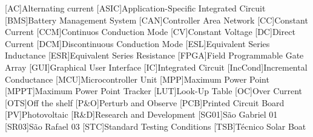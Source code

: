 



\begin{acronym}[H.264/mppt]

    [AC]{Alternating current}
    [ASIC]{Application-Specific Integrated Circuit}
    [BMS]{Battery Management System}
    [CAN]{Controller Area Network}
    [CC]{Constant Current}
    [CCM]{Continuos Conduction Mode}
    [CV]{Constant Voltage}
    [DC]{Direct Current}
    [DCM]{Discontinuous Conduction Mode}
    [ESL]{Equivalent Series Inductance}
    [ESR]{Equivalent Series Resistance}
    [FPGA]{Field Programmable Gate Array}
    [GUI]{Graphical User Interface}
    [IC]{Integrated Circuit}
    [IncCond]{Incremental Conductance}
    [MCU]{Microcontroller Unit}
    [MPP]{Maximum Power Point}
    [MPPT]{Maximum Power Point Tracker}
    [LUT]{Look-Up Table}
    [OC]{Over Current}
    [OTS]{Off the shelf}
    [P\&O]{Perturb and Observe}
    [PCB]{Printed Circuit Board}
    [PV]{Photovoltaic}
    [R\&D]{Research and Development}
    [SG01]{São Gabriel 01}
    [SR03]{São Rafael 03}
    [STC]{Standard Testing Conditions}
    [TSB]{Técnico Solar Boat}


    

    

\end{acronym}







